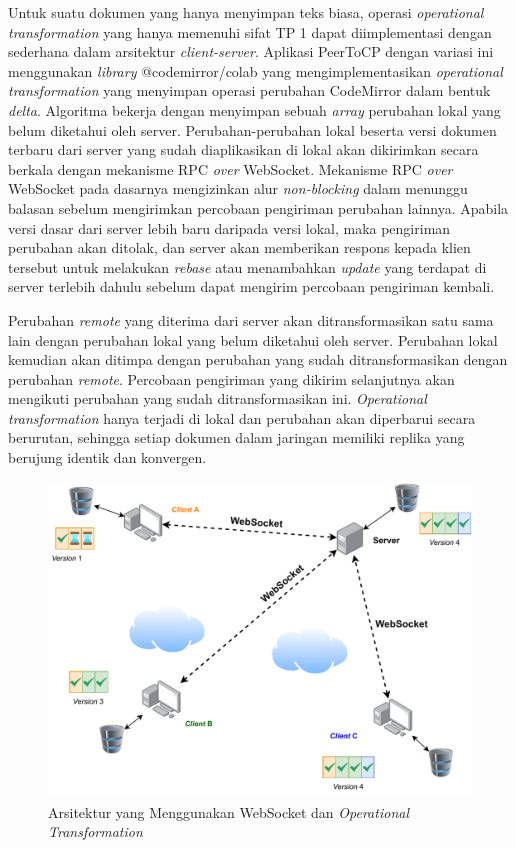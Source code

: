 Untuk suatu dokumen yang hanya menyimpan teks biasa, operasi \textit{operational transformation} yang hanya memenuhi sifat TP 1 dapat diimplementasi dengan sederhana dalam arsitektur \textit{client-server}. Aplikasi PeerToCP dengan variasi ini menggunakan \textit{library} @codemirror/colab yang mengimplementasikan \textit{operational transformation} yang menyimpan operasi perubahan CodeMirror dalam bentuk \textit{delta}. Algoritma bekerja dengan menyimpan sebuah \textit{array} perubahan lokal yang belum diketahui oleh server. Perubahan-perubahan lokal beserta versi dokumen terbaru dari server yang sudah diaplikasikan di lokal akan dikirimkan secara berkala dengan mekanisme RPC \textit{over} WebSocket. Mekanisme RPC \textit{over} WebSocket pada dasarnya mengizinkan alur \textit{non-blocking} dalam menunggu balasan sebelum mengirimkan percobaan pengiriman perubahan lainnya. Apabila versi dasar dari server lebih baru daripada versi lokal, maka pengiriman perubahan akan ditolak, dan server akan memberikan respons kepada klien tersebut untuk melakukan \textit{rebase} atau menambahkan \textit{update} yang terdapat di server terlebih dahulu sebelum dapat mengirim percobaan pengiriman kembali.

Perubahan \textit{remote} yang diterima dari server akan ditransformasikan satu sama lain dengan perubahan lokal yang belum diketahui oleh server. Perubahan lokal kemudian akan ditimpa dengan perubahan yang sudah ditransformasikan dengan perubahan \textit{remote}. Percobaan pengiriman yang dikirim selanjutnya akan mengikuti perubahan yang sudah ditransformasikan ini. \textit{Operational transformation} hanya terjadi di lokal dan perubahan akan diperbarui secara berurutan, sehingga setiap dokumen dalam jaringan memiliki replika yang berujung identik dan konvergen.


\begin{figure}
    \centering
    \includegraphics[scale=0.65]{assets/skripsi/Arsitektur_WebSocket_OT}
    \caption{Arsitektur yang Menggunakan WebSocket dan \textit{Operational Transformation}}
    \label{fig:websocket_ot}
\end{figure}

